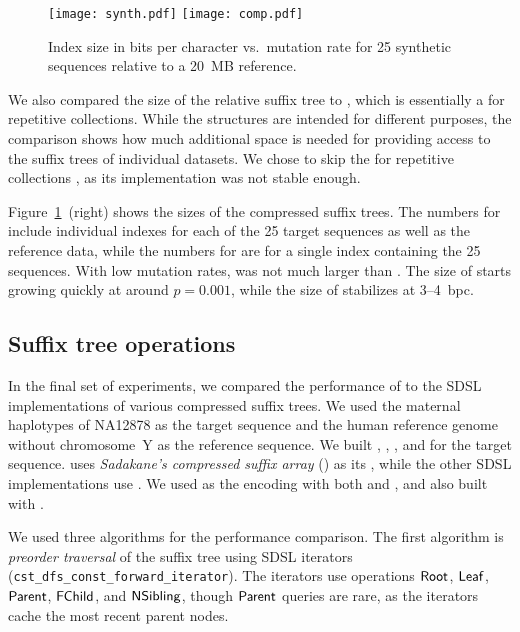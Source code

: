 \begin{figure}
\begin{center}
\texttt{[image: synth.pdf]}%
\hspace{-0.6in}%
\texttt{[image: comp.pdf]}
\end{center}
\caption{Index size in bits per character vs.\ mutation rate for 25
synthetic sequences relative to a 20~MB reference.}\label{fig:synthetic}
\end{figure}

We also compared the size of the relative suffix tree to \GCT{} \cite{Navarro2015},
which is essentially a \CSTsada{} for repetitive collections.
While the structures are intended for different purposes, the comparison shows how
much additional space is needed for providing access to the suffix trees
of individual datasets. We chose to skip the \CSTnpr{} for repetitive collections
\cite{Abeliuk2013}, as its implementation was not stable enough.

Figure~\ref{fig:synthetic}~(right) shows the sizes of the compressed suffix
trees. The numbers for \RST{} include individual indexes for each of the 25
target sequences as well as the reference data, while the numbers for \GCT{}
are for a single index containing the 25 sequences. With low mutation rates,
\RST{} was not much larger than \GCT{}. The size of \RST{} starts growing
quickly at around $p = 0.001$, while the size of \GCT{} stabilizes at
3\nobreakdash--4~bpc.

\subsection{Suffix tree operations}

In the final set of experiments, we compared the performance of \RST{} to the
SDSL implementations of various compressed suffix trees. We used the maternal
haplotypes of NA12878 as the target sequence and the human reference genome
without chromosome~Y as the reference sequence. We built \RST, \CSTsada,
\CSTnpr, and \FCST{} for the target sequence. \CSTsada{} uses \emph{Sadakane's
compressed suffix array} (\CSAsada) \cite{Sadakane2003} as its \CSA, while the
other SDSL implementations use \SSA. We used \PLCP{} as the \LCP{} encoding
with both \CSTsada{} and \CSTnpr{}, and also built \CSTnpr{} with \LCPdac.

We used three algorithms for the performance comparison. The first algorithm is
\emph{preorder traversal} of the suffix tree using SDSL iterators
(\texttt{cst\_dfs\_const\_forward\_iterator}). The iterators use operations
$\mathsf{Root}$, $\mathsf{Leaf}$, $\mathsf{Parent}$, $\mathsf{FChild}$, and $\mathsf{NSibling}$, though $\mathsf{Parent}$
queries are rare, as the iterators cache the most recent parent nodes.


